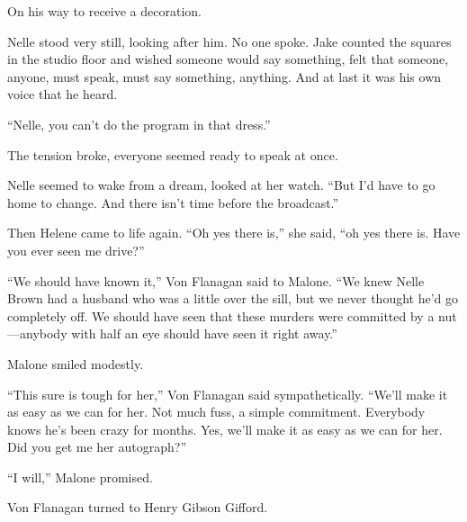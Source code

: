 \documentclass{novel}
\begin{document}
On his way to receive a decoration.

Nelle stood very still, looking after him. No one spoke. Jake counted the squares in the studio floor and wished someone would say something, felt that someone, anyone, must speak, must say something, anything. And at last it was his own voice that he heard.

“Nelle, you can’t do the program in that dress.”

The tension broke, everyone seemed ready to speak at once.

Nelle seemed to wake from a dream, looked at her watch. “But I’d have to go home to change. And there isn’t time before the broadcast.”

Then Helene came to life again. “Oh yes there is,” she said, “oh yes there is. Have you ever seen me drive?”

\begin{ChapterStart}
\vspace{3\nbs}
\end{ChapterStart}

“We should have known it,” Von Flanagan said to Malone. “We knew Nelle Brown had a husband who was a little over the sill, but we never thought he’d go completely off. We should have seen that these murders were committed by a nut—anybody with half an eye should have seen it right away.”

Malone smiled modestly.

“This sure is tough for her,” Von Flanagan said sympathetically. “We’ll make it as easy as we can for her. Not much fuss, a simple commitment. Everybody knows he’s been crazy for months. Yes, we’ll make it as easy as we can for her. Did you get me her autograph?”

“I will,” Malone promised.

Von Flanagan turned to Henry Gibson Gifford.
\end{document}
